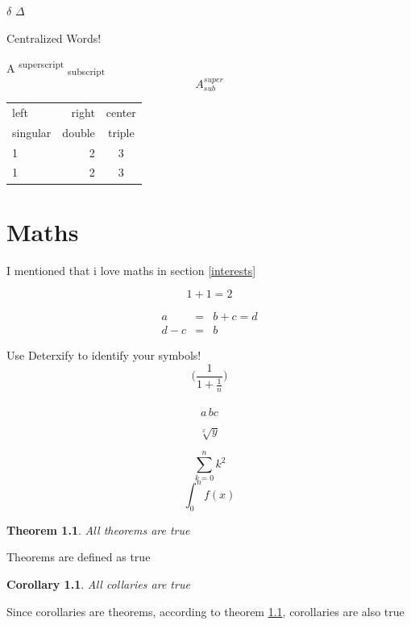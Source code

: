 \documentclass[a4paper]{report}
\begin{document}
$\delta$ $\Delta$ %
\\

\begin{center}
{\small Centralized Words! \\}

A \textsuperscript{superscript} \textsubscript{subscript} 
$$A^{super}_{sub}$$
\end{center}

\begin{tabular}{|l|r|c|}
\hline
left & right & center \\
singular & double & triple \\
\hline
1 & 2 & 3\\
\cline{2-3}
1 & 2 & 3\\
\cline{3-3}
\end{tabular}

\vspace{5px}
 \par

\newpage
\chapter{Maths}
I mentioned that i love maths in section \ref{interests}

\begin{equation}
1+1=2
\end{equation}

\begin{eqnarray*}
a & = & b + c = d\\
d -c & = & b
\end{eqnarray*}

\noindent
Use Deterxify to identify your symbols! \\

$$\biggl(\frac{1}{1+\frac{1}{n}}\biggl)$$ \\

\[ a\,b\!c \] \cite{MIT}

$$\sqrt[x]{y}$$

$$ \sum_{k=0}^n k^2$$
$$ \int_{0}^n f(x)$$


\newtheorem{theorem}{Theorem}
\newtheorem{corollary}{Corollary}[section]
\begin{theorem}
\label{truth}
All theorems are true
\end{theorem}
Theorems are defined as true
\begin{corollary}
All collaries are true
\end{corollary}
Since corollaries are theorems, according to theorem \ref{truth}, corollaries are also true\\
\end{document}
